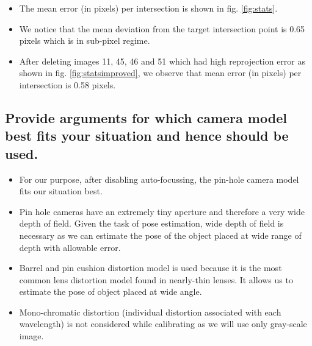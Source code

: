 \begin{itemize}
\item The mean error (in pixels) per intersection is shown in fig. \ref{fig:stats}.
\item We notice that the mean deviation from the target intersection point is 0.65 pixels which is in sub-pixel regime.
\item After deleting images 11, 45, 46 and 51 which had high reprojection error as shown in fig. \ref{fig:statsimproved}, we observe that mean error (in pixels) per intersection is 0.58 pixels.
\end{itemize}
\subsection{Provide arguments for which camera model best fits your situation and hence should be used.}
\begin{itemize}
\item For our purpose, after disabling auto-focussing, the pin-hole camera model fits our situation best.
\item Pin hole cameras have an extremely tiny aperture and therefore a very wide depth of field. Given the task of pose estimation, wide depth of field is necessary as we can estimate the pose of the object placed at wide range of depth with allowable error.
\item Barrel and pin cushion distortion model is used because it is the most common lens distortion model found in nearly-thin lenses. It allows us to estimate the pose of object placed at wide angle.
\item Mono-chromatic distortion (individual distortion associated with each wavelength) is not considered while calibrating as we will use only gray-scale image.    
\end{itemize}

